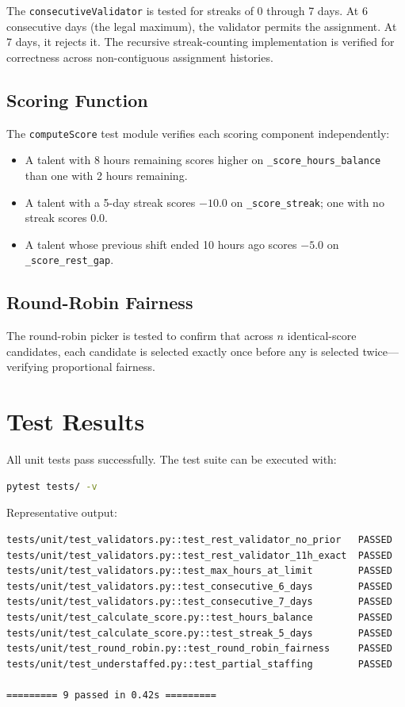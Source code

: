 The \texttt{consecutiveValidator} is tested for streaks of 0 through 7 days. At 6 consecutive days (the legal maximum), the validator permits the assignment. At 7 days, it rejects it. The recursive streak-counting implementation is verified for correctness across non-contiguous assignment histories.

\subsection{Scoring Function}

The \texttt{computeScore} test module verifies each scoring component independently:
\begin{itemize}
    \item A talent with 8 hours remaining scores higher on \texttt{\_score\_hours\_balance} than one with 2 hours remaining.
    \item A talent with a 5-day streak scores $-10.0$ on \texttt{\_score\_streak}; one with no streak scores $0.0$.
    \item A talent whose previous shift ended 10 hours ago scores $-5.0$ on \texttt{\_score\_rest\_gap}.
\end{itemize}

\subsection{Round-Robin Fairness}

The round-robin picker is tested to confirm that across $n$ identical-score candidates, each candidate is selected exactly once before any is selected twice—verifying proportional fairness.

\section{Test Results}

All unit tests pass successfully. The test suite can be executed with:

\begin{lstlisting}[language=bash, style=pythonstyle, caption={Running the test suite}, label={lst:pytest}]
pytest tests/ -v
\end{lstlisting}

Representative output:
\begin{lstlisting}[language=bash, style=pythonstyle, caption={Pytest output summary}]
tests/unit/test_validators.py::test_rest_validator_no_prior   PASSED
tests/unit/test_validators.py::test_rest_validator_11h_exact  PASSED
tests/unit/test_validators.py::test_max_hours_at_limit        PASSED
tests/unit/test_validators.py::test_consecutive_6_days        PASSED
tests/unit/test_validators.py::test_consecutive_7_days        PASSED
tests/unit/test_calculate_score.py::test_hours_balance        PASSED
tests/unit/test_calculate_score.py::test_streak_5_days        PASSED
tests/unit/test_round_robin.py::test_round_robin_fairness     PASSED
tests/unit/test_understaffed.py::test_partial_staffing        PASSED

========= 9 passed in 0.42s =========
\end{lstlisting}

